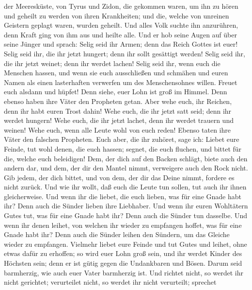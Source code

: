 der Meeresküste, von Tyrus und Zidon, die gekommen waren, um ihn zu
hören und geheilt zu werden von ihren Krankheiten;  und
die, welche von unreinen Geistern geplagt waren, wurden geheilt.
 Und alles Volk suchte ihn anzurühren, denn Kraft ging
von ihm aus und heilte alle.  Und er hob seine Augen auf
über seine Jünger und sprach: Selig seid ihr Armen; denn das Reich
Gottes ist euer!  Selig seid ihr, die ihr jetzt hungert;
denn ihr sollt gesättigt werden! Selig seid ihr, die ihr jetzt weinet;
denn ihr werdet lachen!  Selig seid ihr, wenn euch die
Menschen hassen, und wenn sie euch ausschließen und schmähen und euren
Namen als einen lasterhaften verwerfen um des Menschensohnes willen.
 Freuet euch alsdann und hüpfet! Denn siehe, euer Lohn
ist groß im Himmel. Denn ebenso haben ihre Väter den Propheten getan.
 Aber wehe euch, ihr Reichen, denn ihr habt euren Trost
dahin!  Wehe euch, die ihr jetzt satt seid; denn ihr
werdet hungern! Wehe euch, die ihr jetzt lachet, denn ihr werdet trauern
und weinen!  Wehe euch, wenn alle Leute wohl von euch
reden! Ebenso taten ihre Väter den falschen Propheten. 
Euch aber, die ihr zuhöret, sage ich: Liebet eure Feinde, tut wohl
denen, die euch hassen;  segnet, die euch fluchen, und
bittet für die, welche euch beleidigen!  Dem, der dich
auf den Backen schlägt, biete auch den andern dar, und dem, der dir den
Mantel nimmt, verweigere auch den Rock nicht.  Gib jedem,
der dich bittet, und von dem, der dir das Deine nimmt, fordere es nicht
zurück.  Und wie ihr wollt, daß euch die Leute tun
sollen, tut auch ihr ihnen gleicherweise.  Und wenn ihr
die liebet, die euch lieben, was für eine Gnade habt ihr? Denn auch die
Sünder lieben ihre Liebhaber.  Und wenn ihr euren
Wohltätern Gutes tut, was für eine Gnade habt ihr? Denn auch die Sünder
tun dasselbe.  Und wenn ihr denen leihet, von welchen ihr
wieder zu empfangen hoffet, was für eine Gnade habt ihr? Denn auch die
Sünder leihen den Sündern, um das Gleiche wieder zu empfangen.
 Vielmehr liebet eure Feinde und tut Gutes und leihet,
ohne etwas dafür zu erhoffen; so wird euer Lohn groß sein, und ihr
werdet Kinder des Höchsten sein; denn er ist gütig gegen die Undankbaren
und Bösen.  Darum seid barmherzig, wie auch euer Vater
barmherzig ist.  Und richtet nicht, so werdet ihr nicht
gerichtet; verurteilet nicht, so werdet ihr nicht verurteilt; sprechet
